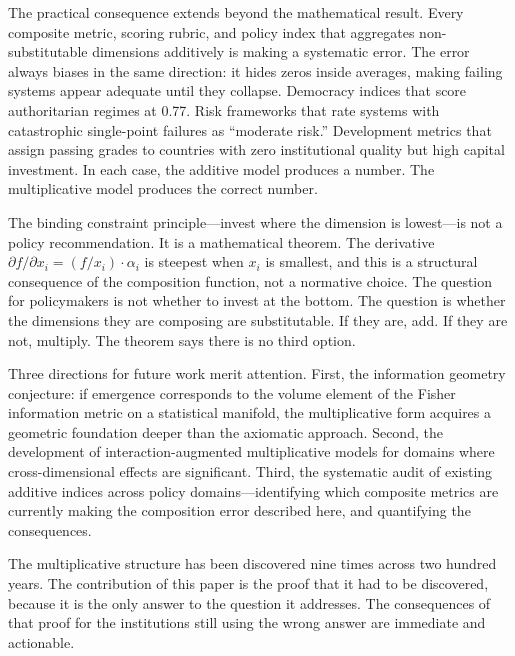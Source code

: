 \documentclass[12pt, a4paper]{article}
\theoremstyle{definition}
\theoremstyle{remark}
\begin{document}
The practical consequence extends beyond the mathematical result. Every composite metric, scoring rubric, and policy index that aggregates non-substitutable dimensions additively is making a systematic error. The error always biases in the same direction: it hides zeros inside averages, making failing systems appear adequate until they collapse. Democracy indices that score authoritarian regimes at 0.77. Risk frameworks that rate systems with catastrophic single-point failures as ``moderate risk.'' Development metrics that assign passing grades to countries with zero institutional quality but high capital investment. In each case, the additive model produces a number. The multiplicative model produces the correct number.

The binding constraint principle---invest where the dimension is lowest---is not a policy recommendation. It is a mathematical theorem. The derivative $\partial f / \partial x_i = (f / x_i) \cdot \alpha_i$ is steepest when $x_i$ is smallest, and this is a structural consequence of the composition function, not a normative choice. The question for policymakers is not whether to invest at the bottom. The question is whether the dimensions they are composing are substitutable. If they are, add. If they are not, multiply. The theorem says there is no third option.

Three directions for future work merit attention. First, the information geometry conjecture: if emergence corresponds to the volume element of the Fisher information metric on a statistical manifold, the multiplicative form acquires a geometric foundation deeper than the axiomatic approach. Second, the development of interaction-augmented multiplicative models for domains where cross-dimensional effects are significant. Third, the systematic audit of existing additive indices across policy domains---identifying which composite metrics are currently making the composition error described here, and quantifying the consequences.

The multiplicative structure has been discovered nine times across two hundred years. The contribution of this paper is the proof that it had to be discovered, because it is the only answer to the question it addresses. The consequences of that proof for the institutions still using the wrong answer are immediate and actionable.


\appendix
\end{document}
